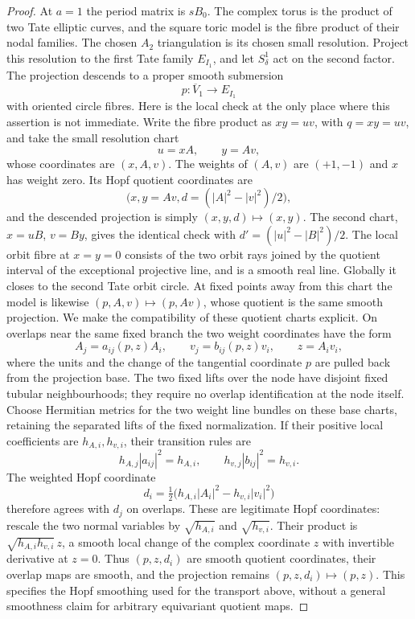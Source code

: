 \begin{proof}
At $a=1$ the period matrix is $sB_0$. The complex torus is
the product of two Tate elliptic curves, and the square toric
model is the fibre product of their nodal families. The chosen
$A_2$ triangulation is its chosen small resolution. Project
this resolution to the first Tate family $E_{I_1}$, and let
$S^1_\delta$ act on the second factor. The projection descends
to a proper smooth submersion
\[
 p:\overline V_1\longrightarrow E_{I_1}
\]
with oriented circle fibres. Here is the local check at the
only place where this assertion is not immediate. Write the
fibre product as $xy=uv$, with $q=xy=uv$, and take the small
resolution chart
\[
 u=xA,\qquad y=Av,
\]
whose coordinates are $(x,A,v)$. The weights of $(A,v)$ are
$(+1,-1)$ and $x$ has weight zero. Its Hopf quotient coordinates
are
\[
 \bigl(x,y=Av,d=(|A|^2-|v|^2)/2\bigr),
\]
and the descended projection is simply $(x,y,d)\mapsto(x,y)$.
The second chart, $x=uB$, $v=By$, gives the identical check
with $d'=(|u|^2-|B|^2)/2$. The local orbit fibre at $x=y=0$
consists of the two orbit rays joined by the quotient interval
of the exceptional projective line, and is a smooth real line.
Globally it closes to the second Tate orbit circle. At fixed
points away from this chart the model is likewise
$(p,A,v)\mapsto(p,Av)$, whose quotient is the same smooth
projection. We make the compatibility of these quotient charts
explicit. On overlaps near the same fixed branch the two weight
coordinates have the form
\[
 A_j=a_{ij}(p,z)A_i,\qquad v_j=b_{ij}(p,z)v_i,
 \qquad z=A_iv_i,
\]
where the units and the change of the tangential coordinate
$p$ are pulled back from the projection base. The two fixed
lifts over the node have disjoint fixed tubular neighbourhoods;
they require no overlap identification at the node itself.
Choose Hermitian metrics for the two weight line bundles on
these base charts, retaining the separated lifts of the fixed
normalization. If their positive local coefficients are
$h_{A,i},h_{v,i}$, their transition rules are
\[
 h_{A,j}|a_{ij}|^2=h_{A,i},\qquad
 h_{v,j}|b_{ij}|^2=h_{v,i}.
\]
The weighted Hopf coordinate
\[
 d_i=\tfrac12\bigl(h_{A,i}|A_i|^2-h_{v,i}|v_i|^2\bigr)
\]
therefore agrees with $d_j$ on overlaps. These are legitimate
Hopf coordinates: rescale the two normal variables by
$\sqrt{h_{A,i}}$ and $\sqrt{h_{v,i}}$. Their product is
$\sqrt{h_{A,i}h_{v,i}}\,z$, a smooth local change of the
complex coordinate $z$ with invertible derivative at $z=0$.
Thus $(p,z,d_i)$ are smooth quotient coordinates, their
overlap maps are smooth, and the projection remains
$(p,z,d_i)\mapsto(p,z)$. This specifies the Hopf smoothing
used for the transport above, without a general smoothness
claim for arbitrary equivariant quotient maps.


\end{proof}
